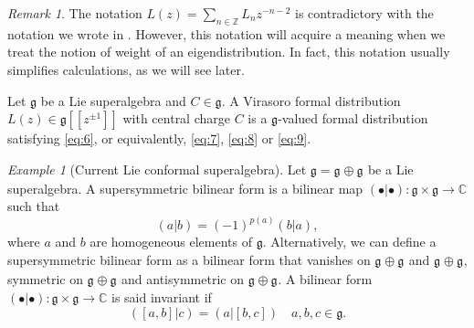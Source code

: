 \documentclass[a4paper, 12pt, reqno]{amsart}
\theoremstyle{remark}
\newtheorem{remark}[theorem]{Remark}
\newtheorem{example}[theorem]{Example}
\numberwithin{equation}{subsection}
\DeclareMathOperator{\zero}{\overline{0}}
\DeclareMathOperator{\one}{\overline{1}}
\begin{document}
\begin{remark}
  \label{rmk:6}
  The notation $L(z) = \sum_{n \in \mathbb{Z}}L_nz^{-n - 2}$ is contradictory with the notation we wrote in .
  However, this notation will acquire a meaning when we treat the notion of weight of an eigendistribution.
  In fact, this notation usually simplifies calculations, as we will see later.
\end{remark}

Let $\mathfrak{g}$ be a Lie superalgebra and $C \in \mathfrak{g}$.
A Virasoro formal distribution $L(z) \in \mathfrak{g}[[z^{\pm 1}]]$ with central charge $C$ is a $\mathfrak{g}$-valued formal distribution satisfying \eqref{eq:6}, or equivalently, \eqref{eq:7}, \eqref{eq:8} or \eqref{eq:9}.

\begin{example}[Current Lie conformal superalgebra]
  \label{exa:2}
  Let $\mathfrak{g} = \mathfrak{g}_{\zero} \oplus \mathfrak{g}_{\one}$ be a Lie superalgebra.
  A supersymmetric bilinear form is a bilinear map $(\bullet| \bullet): \mathfrak{g} \times \mathfrak{g} \to \mathbb{C}$ such that
  \begin{equation*}
    (a| b) = (-1)^{p(a)}(b| a),
  \end{equation*}
  where $a$ and $b$ are homogeneous elements of $\mathfrak{g}$.
  Alternatively, we can define a supersymmetric bilinear form as a bilinear form that vanishes on $\mathfrak{g}_{\zero} \oplus \mathfrak{g}_{\one}$ and $\mathfrak{g}_{\one} \oplus \mathfrak{g}_{\zero}$, symmetric on $\mathfrak{g}_{\zero} \oplus \mathfrak{g}_{\zero}$ and antisymmetric on $\mathfrak{g}_{\one} \oplus \mathfrak{g}_{\one}$.
  A bilinear form $(\bullet| \bullet): \mathfrak{g} \times \mathfrak{g} \to \mathbb{C}$ is said invariant if
  \begin{equation*}
    ([a, b]| c)=(a| [b, c])\quad a, b, c \in \mathfrak{g}.
  \end{equation*}


\end{example}
\end{document}
